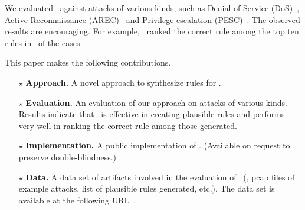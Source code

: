 \documentclass[conference]{IEEEtran}
\begin{document}
We evaluated \tname\ against \totalAttacks attacks of various kinds, such as 
 Denial-of-Service (DoS)~\cite{denial-of-service},
Active Reconnaissance (AREC)~\cite{active-reconnaissance} and Privilege
escalation (PESC)~\cite{privilege-escalation}. %
The observed results are encouraging. For 
example, \tname\ ranked the correct rule among the top ten rules in 
\percTopFiveRanking\ of the cases. 





This paper makes the following contributions.

\newcommand{\Contrib}[1]{$\star$#1}
\begin{itemize}[topsep=.2ex,itemsep=.2ex,leftmargin=0.8em]

\item[\Contrib{}]\textbf{Approach.} A novel approach to synthesize
  rules for \nids.

\item[\Contrib{}]\textbf{Evaluation.} An evaluation of our approach on
  attacks of various kinds. Results indicate that \tname\ is effective
  in creating plausible rules and performs very well in ranking the
  correct rule among those generated.

\item[\Contrib{}]\textbf{Implementation.} A public implementation of
  \tname. (Available on request to preserve double-blindness.)

\item[\Contrib{}]\textbf{Data.} A data set of artifacts involved in
  the evaluation of \tname\ (\eg{}, pcap files of example attacks, list
  of plausible rules generated, etc.). The data set is available at
  the following URL~\ourdataset.
  
\end{itemize}
\end{document}
